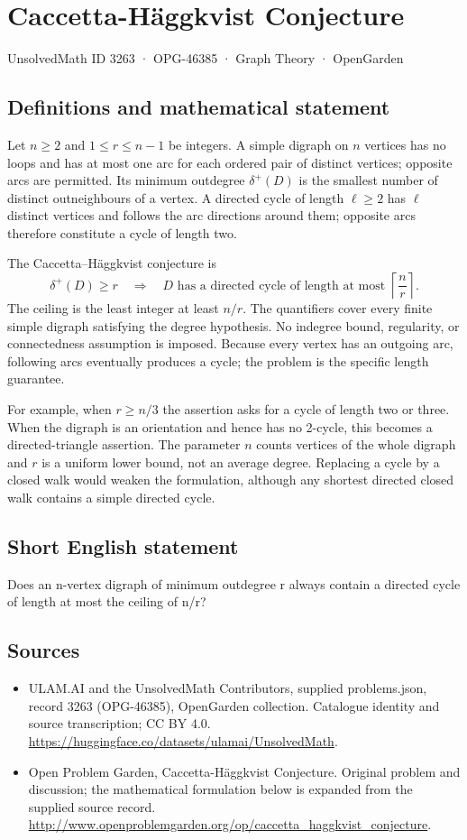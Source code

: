 \documentclass[11pt,a4paper]{article}
\begin{document}
\section*{Caccetta-Häggkvist Conjecture}\label{3263}
{\small UnsolvedMath ID 3263 · OPG-46385 · Graph Theory · OpenGarden}
\subsection{Definitions and mathematical statement}
Let $n\ge2$ and $1\le r\le n-1$ be integers. A simple digraph on $n$
vertices has no loops and has at most one arc for each ordered pair of
distinct vertices; opposite arcs are permitted. Its minimum outdegree
$\delta^+(D)$ is the smallest number of distinct outneighbours of a
vertex. A directed cycle of length $\ell\ge2$ has $\ell$ distinct
vertices and follows the arc directions around them; opposite arcs
therefore constitute a cycle of length two.

The Caccetta--Häggkvist conjecture is
\[
 \delta^+(D)\ge r\quad\Longrightarrow\quad
 D\text{ has a directed cycle of length at most }
                         \left\lceil\frac nr\right\rceil.
\]
The ceiling is the least integer at least $n/r$. The quantifiers cover
every finite simple digraph satisfying the degree hypothesis. No
indegree bound, regularity, or connectedness assumption is imposed.
Because every vertex has an outgoing arc, following arcs eventually
produces a cycle; the problem is the specific length guarantee.

For example, when $r\ge n/3$ the assertion asks for a cycle of length
two or three. When the digraph is an orientation and hence has no
2-cycle, this becomes a directed-triangle assertion. The parameter $n$
counts vertices of the whole digraph and $r$ is a uniform lower bound,
not an average degree. Replacing a cycle by a closed walk would weaken
the formulation, although any shortest directed closed walk contains
a simple directed cycle.
\subsection{Short English statement}
Does an n-vertex digraph of minimum outdegree r always contain a directed cycle of length at most the ceiling of n/r?
\subsection{Sources}
\begin{itemize}
\item[S1] ULAM.AI and the UnsolvedMath Contributors, supplied problems.json, record 3263 (OPG-46385), OpenGarden collection. Catalogue identity and source transcription; CC BY 4.0.
\url{https://huggingface.co/datasets/ulamai/UnsolvedMath}.
\item[S2] Open Problem Garden, Caccetta-Häggkvist Conjecture. Original problem and discussion; the mathematical formulation below is expanded from the supplied source record.
\url{http://www.openproblemgarden.org/op/caccetta_haggkvist_conjecture}.
\end{itemize}
\end{document}
